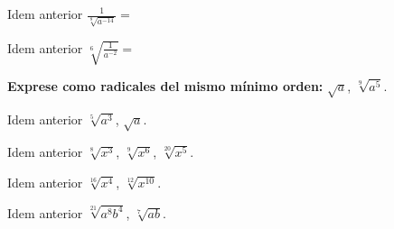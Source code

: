 \message{ !name(GUIA-1-LENGUAJE-ALGEBRAICO.tex)}\documentclass[12pt,addpoints,x11names]{exam}
\begin{document}
\begin{questions}
\begin{multicols}{2}
    \question Idem anterior $\frac{1}{\sqrt[8]{a^{-14}}}=$

    \question Idem anterior $\sqrt[6]{\frac{1}{a^{-2}}}=$

    \question \textbf{Exprese como radicales del mismo mínimo orden:} $\sqrt{a}$, $\sqrt[9]{a^5}$.
      
    \question Idem anterior $\sqrt[5]{a^3}$, $\sqrt{a}$.
      
    \question Idem anterior $\sqrt[8]{x^3}$, $\sqrt[9]{x^6}$, $\sqrt[20]{x^5}$.
      
    \question Idem anterior $\sqrt[16]{x^4}$, $\sqrt[12]{x^{10}}$.
      
    \question Idem anterior $\sqrt[21]{a^8b^4}$, $\sqrt[7]{ab}$.

  
\end{multicols}
\end{questions}
\end{document}
